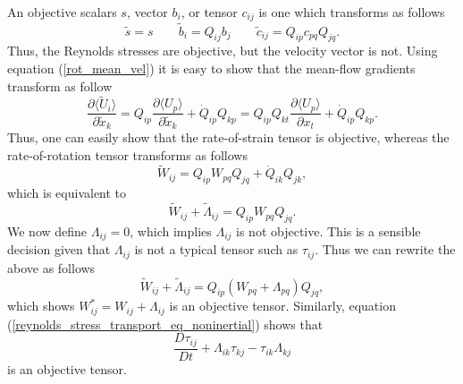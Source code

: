 \documentclass[oneside,a4paper,11pt]{report}
\newcommand{\rs}{\tau}          %
\newcommand{\upavg}{\langle U_p \rangle}
\begin{document}
An objective scalars $s$, vector $b_i$, or tensor $c_{ij}$ is one which transforms as follows
\begin{equation}
\tilde{s} = s \qquad \tilde{b}_i = Q_{ij}b_j \qquad \tilde{c}_{ij} = Q_{ip}c_{pq}Q_{jq}. 
\end{equation}
Thus, the Reynolds stresses are objective, but the velocity vector is not. Using equation (\ref{rot_mean_vel}) it is easy to show that the mean-flow gradients transform as follow
\begin{equation}
\label{grad_transformation}
\frac{\partial \langle \tilde{U}_i \rangle}{\partial \tilde{x}_k} = Q_{ip} \frac{\partial \upavg}{\partial \tilde{x}_k} + \dot{Q}_{ip}Q_{kp} = Q_{ip}Q_{kt} \frac{\partial \upavg}{\partial x_t} + \dot{Q}_{ip}Q_{kp}.
\end{equation}
Thus, one can easily show that the rate-of-strain tensor is objective, whereas the rate-of-rotation tensor transforms as follows
\begin{equation}
\tilde{W}_{ij} = Q_{ip}W_{pq}Q_{jq} + \dot{Q}_{ik}Q_{jk},
\end{equation}
which is equivalent to
\begin{equation}
\tilde{W}_{ij} + \tilde{\Lambda}_{ij}= Q_{ip}W_{pq}Q_{jq}.
\end{equation}
We now define $\Lambda_{ij} = 0$, which implies $\Lambda_{ij}$ is not objective. This is a sensible decision given that $\Lambda_{ij}$ is not a typical tensor such as $\rs_{ij}$. Thus we can rewrite the above as follows
\begin{equation}
\tilde{W}_{ij} + \tilde{\Lambda}_{ij}= Q_{ip} (W_{pq} + \Lambda_{pq} )Q_{jq},
\end{equation}
which shows $W^*_{ij} = W_{ij} + \Lambda_{ij}$ is an objective tensor. Similarly, equation (\ref{reynolds_stress_transport_eq_noninertial}) shows that 
\begin{equation}
\frac{D \rs_{ij}}{Dt} + \Lambda_{ik} \rs_{kj} - \rs_{ik} \Lambda_{kj}
\end{equation}
is an objective tensor.
\end{document}
